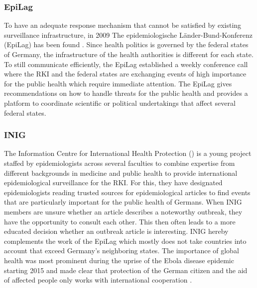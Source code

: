 \subsubsection{EpiLag}
To have an adequate response mechanism that cannot be satisfied by existing surveillance infrastructure, in 2009 The epidemiologische L\"ander-Bund-Konferenz (\gls{EpiLag}) has been found \cite{Mohr2010}. Since health politics is governed by the federal states of Germany, the infrastructure of the health authorities is different for each state. To still communicate efficiently, the EpiLag established a weekly conference call where the RKI and the federal states are exchanging events of high importance for the public health which require immediate attention. The EpiLag gives recommendations on how to handle threats for the public health and provides a platform to coordinate scientific or political undertakings that affect several federal states.

\subsubsection{INIG}
The Information Centre for International Health Protection () is a young project staffed by epidemiologists across several faculties to combine expertise from different backgrounds in medicine and public health to provide international epidemiological surveillance for the RKI. For this, they have designated epidemiologists reading trusted sources for epidemiological articles to find events that are particularly important for the public health of Germans. When INIG members are unsure whether an article describes a noteworthy outbreak, they have the opportunity to consult each other. This then often leads to a more educated decision whether an outbreak article is interesting. INIG hereby complements the work of the EpiLag which mostly does not take countries into account that exceed Germany's neighboring states. The importance of global health was most prominent during the uprise of the Ebola disease epidemic starting 2015 and made clear that protection of the German citizen and the aid of affected people only works with international cooperation \cite{Grohe2017}.

